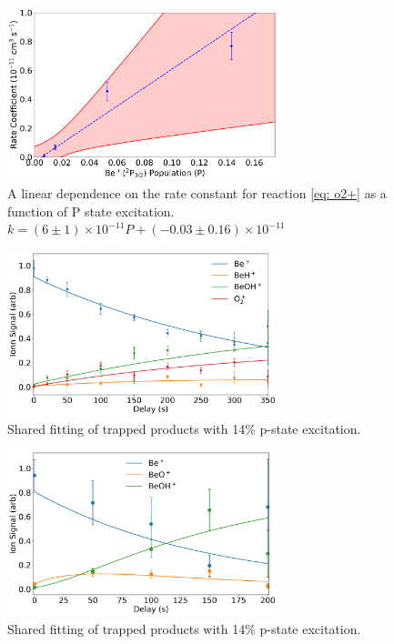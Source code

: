 \documentclass[a4paper]{article}
\begin{document}
\begin{figure}[H]
\centering
\includegraphics[width=0.7\textwidth]{beo_p_state.png}
\caption{\label{fig: p-state} A linear dependence on the rate constant for reaction \ref{eq: o2+} as a function of P state excitation. $k = (6 \pm 1) \times 10^{-11} P + (-0.03 \pm 0.16) \times 10^{-11}$}
\end{figure}


\begin{figure}[H]
\centering
\includegraphics[width=0.7\textwidth]{beo_laser_fit.png}
\caption{\label{fig: laser fit} Shared fitting of trapped products with 14\% p-state excitation.}
\end{figure}

\begin{figure}[H]
\centering
\includegraphics[width=0.7\textwidth]{beo_no_laser_fit.png}
\caption{\label{fig: no laser fit} Shared fitting of trapped products with 14\% p-state excitation.}
\end{figure}
\end{document}
